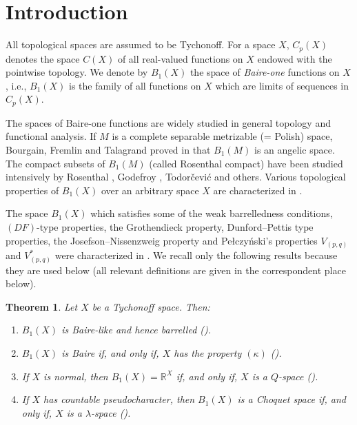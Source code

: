 \documentclass[preprint,11pt]{elsarticle}
\newtheorem{theorem}{Theorem}[section]
\numberwithin{equation}{section}
\numberwithin{theorem}{section}
\newcommand{\IR}{\mathbb{R}}
\begin{document}
\section{Introduction}


All topological spaces are assumed to be Tychonoff. For a space $X$, $C_p(X)$ denotes the space $C(X)$ of all real-valued functions on $X$ endowed with the pointwise topology. We denote by $B_1(X)$ the space of {\em Baire-one} functions on $X$, i.e., $B_1(X)$ is the family of all functions on $X$ which are limits of sequences in $C_p(X)$.

The spaces of Baire-one functions are widely studied in general topology and functional analysis.
If $M$ is a complete separable metrizable (= Polish) space, Bourgain, Fremlin and Talagrand proved in \cite{BFT} that $B_1(M)$ is an angelic space. The compact subsets of $B_1(M)$ (called Rosenthal compact) have been studied intensively by Rosenthal \cite{Rosenthal-compact}, Godefroy \cite{Godefroy}, Todor\v{c}evi\'{c} \cite{Todorcevic} and others. Various topological properties of $B_1(X)$ over an arbitrary space $X$ are characterized in \cite{BG-Baire,Gabr-B1,Gabr-seq-Ascoli,Osipov-25,Osipov-251,Osipov-252,Pytkeev-B1}.

The space $B_1(X)$ which satisfies some of the weak barrelledness conditions, $(DF)$-type properties, the Grothendieck property, Dunford--Pettis type properties, the Josefson--Nissenzweig property and Pe{\l}czy\'{n}ski's properties $V_{(p,q)}$ and $V_{(p,q)}^\ast$ were characterized in \cite{BG-Baire-lcs,BG-JNP,Gab-Pel}. We recall only the following results because they are used below (all relevant definitions are given in the correspondent place below).
\begin{theorem} \label{t:B1-Baire-like}
Let $X$ be a Tychonoff space. Then:
\begin{enumerate}
\item[{\rm(i)}]  $B_1(X)$ is Baire-like and hence barrelled {\rm(\cite{BG-Baire-lcs})}.
\item[{\rm(ii)}] $B_1(X)$ is Baire if, and only if, $X$ has the property $(\kappa)$ {\rm(\cite{Osipov-252})}.
\item[{\rm(iii)}] If $X$ is normal, then $B_1(X)=\IR^X$ if, and only if, $X$ is a $Q$-space {\rm(\cite{BG-Baire})}.
\item[{\rm(iv)}] If $X$ has countable pseudocharacter, then $B_1(X)$ is a Choquet space if, and only if, $X$ is a $\lambda$-space {\rm(\cite{BG-Baire})}.
\end{enumerate}
\end{theorem}
\end{document}
